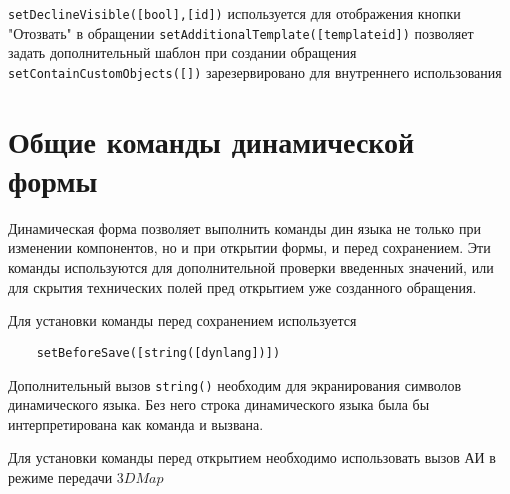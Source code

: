 \documentclass[../index.tex]{subfiles}
\begin{document}
\verb|setDeclineVisible([bool],[id])| используется для отображения кнопки "Отозвать" в обращении
\verb|setAdditionalTemplate([templateid])| позволяет задать дополнительный шаблон при создании обращения
\verb|setContainCustomObjects([])| зарезервировано для внутреннего использования

\section{Общие команды динамической формы}
Динамическая форма позволяет выполнить команды дин языка не только при изменении компонентов, но и при открытии формы,
и перед сохранением. Эти команды используются для дополнительной проверки введенных значений, или для скрытия 
технических полей пред открытием уже созданного обращения.

Для установки команды перед сохранением используется
\begin{verbatim}
    setBeforeSave([string([dynlang])])
\end{verbatim}
Дополнительный вызов \verb|string()| необходим для экранирования символов динамического языка. Без него строка динамического языка
была бы интерпретирована как команда и вызвана.

Для установки команды перед открытием необходимо использовать вызов АИ в режиме передачи $3DMap$
\end{document}
